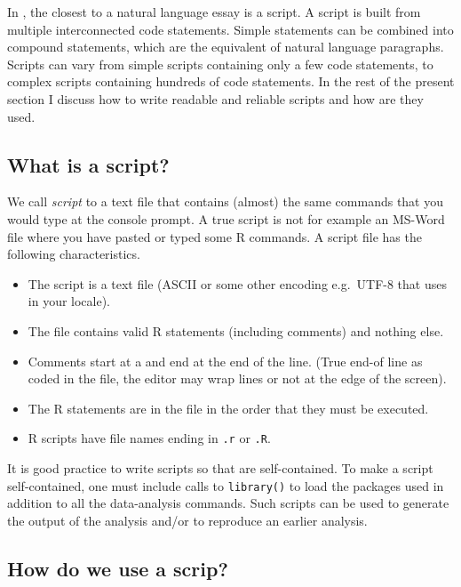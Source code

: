 \documentclass[krantz2]{krantz}\usepackage{knitr}%
\begin{document}
In \Rlang, the closest to a natural language essay is a script. A script is built from multiple interconnected code statements. Simple statements can be combined into compound statements, which are the equivalent of natural language paragraphs. Scripts can vary from simple scripts containing only a few code statements, to complex scripts containing hundreds of code statements. In the rest of the present section I discuss how to write readable and reliable scripts and how are they used.

\subsection{What is a script?}\label{sec:script:what:is}
We call \textit{script} to a text file that contains (almost) the same commands that you would type at the console prompt. A true script is not for example an MS-Word file where you have pasted or typed some R commands. A script file has the following characteristics.
\begin{itemize}
  \item The script is a text file (ASCII or some other encoding e.g.\ UTF-8 that \Rpgrm uses in your locale).
  \item The file contains valid R statements (including comments) and nothing else.
  \item Comments start at a \code{\#} and end at the end of the line. (True end-of line as coded in the file, the editor may wrap lines or not at the edge of the screen).
  \item The R statements are in the file in the order that they must be executed.
  \item R scripts have file names ending in \texttt{.r} or \texttt{.R}.
\end{itemize}

It is good practice to write scripts so that are self-contained. To make a script self-contained, one must include calls to \texttt{library()} to load the packages used in addition to all the data-analysis commands. Such scripts can be used to generate the output of the analysis and/or to reproduce an earlier analysis.



\subsection{How do we use a scrip?}\label{sec:script:using}
\end{document}
